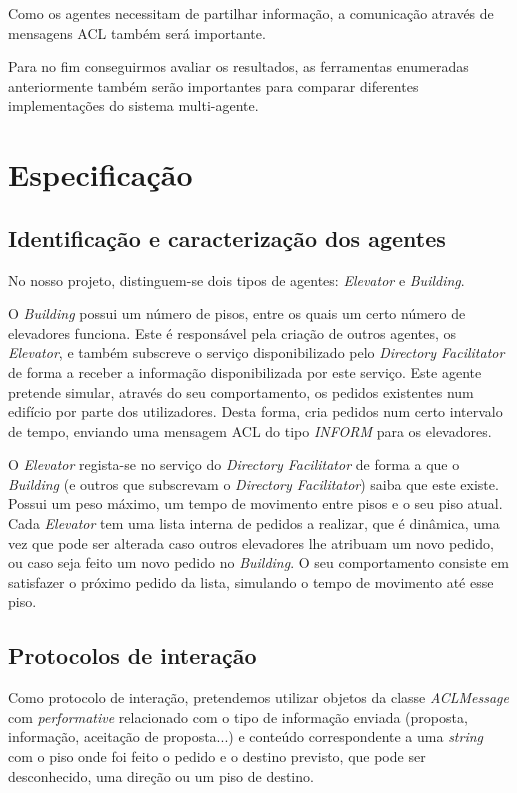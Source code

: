 \documentclass[a4paper]{article}
\begin{document}
Como os agentes necessitam de partilhar informação, a comunicação através de mensagens ACL também será importante.

Para no fim conseguirmos avaliar os resultados, as ferramentas enumeradas anteriormente também serão importantes para comparar diferentes implementações do sistema multi-agente.

\newpage

\section{Especificação}

\subsection{Identificação e caracterização dos agentes} 

No nosso projeto, distinguem-se dois tipos de agentes: \textit{Elevator} e \textit{Building}.

O \textit{Building} possui um número de pisos, entre os quais um certo número de elevadores funciona. Este é responsável pela criação de outros agentes, os \textit{Elevator}, e também subscreve o serviço disponibilizado pelo \textit{Directory Facilitator} de forma a receber a informação disponibilizada por este serviço. Este agente pretende simular, através do seu comportamento, os pedidos existentes num edifício por parte dos utilizadores. Desta forma, cria pedidos num certo intervalo de tempo, enviando uma mensagem ACL do tipo \textit{INFORM} para os elevadores.

O \textit{Elevator} regista-se no serviço do \textit{Directory Facilitator} de forma a que o \textit{Building} (e outros que subscrevam o \textit{Directory Facilitator}) saiba que este existe. Possui um peso máximo, um tempo de movimento entre pisos e o seu piso atual. Cada \textit{Elevator} tem uma lista interna de pedidos a realizar, que é dinâmica, uma vez que pode ser alterada caso outros elevadores lhe atribuam um novo pedido, ou caso seja feito um novo pedido no \textit{Building}. O seu comportamento consiste em satisfazer o próximo pedido da lista, simulando o tempo de movimento até esse piso.

\subsection{Protocolos de interação} 

Como protocolo de interação, pretendemos utilizar objetos da classe \textit{ACLMessage} com \textit{performative} relacionado com o tipo de informação enviada (proposta, informação, aceitação de proposta...) e conteúdo correspondente a uma \textit{string} com o piso onde foi feito o pedido e o destino previsto, que pode ser desconhecido, uma direção ou um piso de destino.
\end{document}
